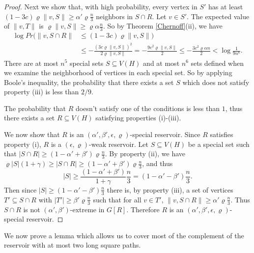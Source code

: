 \documentclass[oneside,12pt]{memoir}
\newcommand{\ep}{\epsilon}
\begin{document}
\begin{proof}
Next we show that, with high probability, every vertex in $S'$ has
at least $(1-3c)\varrho \|v,S\|\geq \alpha'\varrho\frac{n}{3}$ neighbors in $S\cap R$.
Let $v\in S'$. The expected value of $\|v,T\|$ is $\varrho\|v,S\|\geq \varrho\alpha\frac{n}{3}$. So by Theorem \ref{Chernoff}(ii), we have
\begin{align*}
\log Pr(\|v,S\cap R\|&\leq(1-3c)\varrho\|v,S\|)\\
&\leq-\frac{(3c\varrho\|v,S\|)^2}{2\varrho\|v,S\|}=-\frac{9c^2\varrho \|v,S\|}{2}\leq -\frac{3c^2\varrho \alpha n}{2}<\log \frac{1}{9n^{6}}.\end{align*}
There are at most $n^5$ special sets $S\subseteq V(H)$ and at most $n^6$ sets defined when we examine the neighborhood of vertices in each special set.  So by applying Boole's inequality, the probability that there exists a set $S$ which does not satisfy property (iii) is less than $2/9$.

The probability that $R$ doesn't satisfy one of the conditions is less than $1$, thus there exists a set $R\subseteq V(H)$ satisfying properties (i)-(iii).

We now show that $R$ is an $(\alpha', \beta', \ep, \varrho)$-special reservoir.  Since $R$ satisfies property (i), $R$ is a $(\ep, \varrho)$-weak reservoir.  Let $S\subseteq V(H)$ be a special set such that $|S\cap R|\geq(1-\alpha'+\beta')\varrho\frac{ n}{3}$.
By property (ii), we have $\varrho|S|(1+\gamma)\geq|S\cap R|\geq(1-\alpha'+\beta')\varrho\frac{ n}{3}$, and thus $$|S|\geq\frac{(1-\alpha'+\beta')}{1+\gamma}\frac{n}{3}=(1-\alpha'-\beta')\frac{n}{3}.$$
Then since $|S|\geq(1-\alpha'-\beta')\frac{n}{3}$ 
there is, by property (iii), a set of vertices $T'\subseteq S\cap R$ with $|T'|\geq\beta'\varrho\frac{ n}{3}$
such that for all $v\in T'$, $\|v,S\cap R\|\geq\alpha'\varrho\frac{ n}{3}$.
Thus $S\cap R$ is not $(\alpha', \beta')$-extreme in $G[R]$.  Therefore $R$ is an $(\alpha', \beta', \ep, \varrho)$-special reservoir.
\end{proof}

We now prove a lemma which allows us to cover most of the complement
of the reservoir with at most two long square paths.
\end{document}
